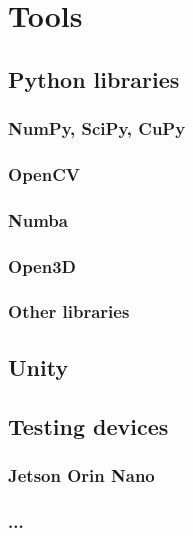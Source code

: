 \chapter{Tools}
\label{chap:tools}

\section{Python libraries}
\subsection{NumPy, SciPy, CuPy}
\subsection{OpenCV}
\subsection{Numba}
\subsection{Open3D}
\subsection{Other libraries}

\section{Unity}

\section{Testing devices}
\subsection{Jetson Orin Nano}
\subsection{...}
